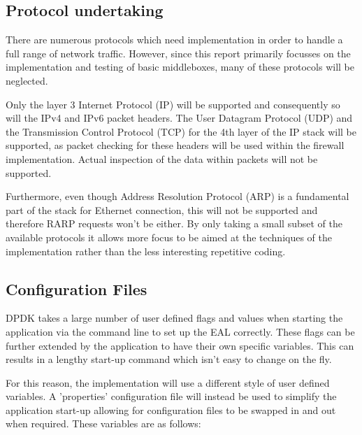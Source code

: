 \documentclass[final_report.tex]{subfiles}
\begin{document}
\subsection{Protocol undertaking}
There are numerous protocols which need implementation in order to handle a full range of network traffic. However, since this report primarily focusses on the implementation and testing of basic middleboxes, many of these protocols will be neglected.

Only the layer 3 Internet Protocol (IP) will be supported and consequently so will the IPv4 and IPv6 packet headers. The User Datagram Protocol (UDP) and the Transmission Control Protocol (TCP) for the 4th layer of the IP stack will be supported, as packet checking for these headers will be used within the firewall implementation. Actual inspection of the data within packets will not be supported.

Furthermore, even though Address Resolution Protocol (ARP) is a fundamental part of the stack for Ethernet connection, this will not be supported and therefore RARP requests won't be either. By only taking a small subset of the available protocols it allows more focus to be aimed at the techniques of the implementation rather than the less interesting repetitive coding.

\subsection{Configuration Files}
DPDK takes a large number of user defined flags and values when starting the application via the command line to set up the EAL correctly. These flags can be further extended by the application to have their own specific variables. This can results in a lengthy start-up command which isn't easy to change on the fly.

For this reason, the implementation will use a different style of user defined variables. A 'properties' configuration file will instead be used to simplify the application start-up allowing for configuration files to be swapped in and out when required. These variables are as follows:
\end{document}
